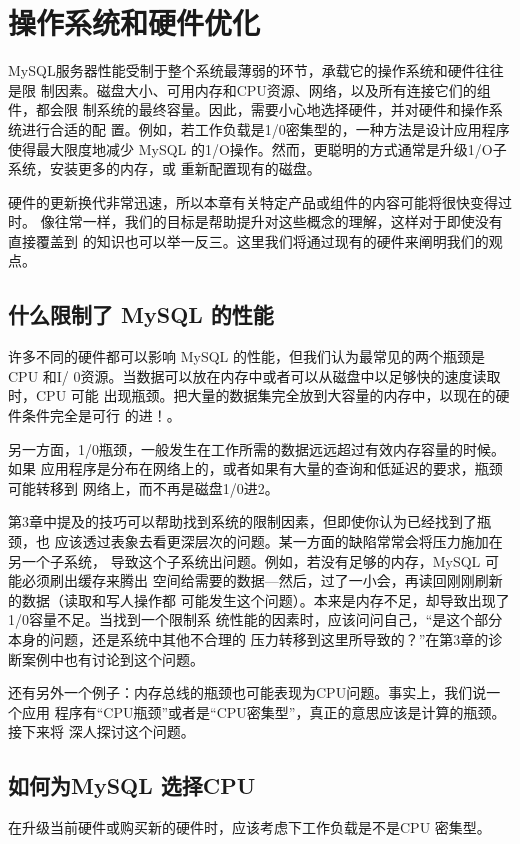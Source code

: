 \chapter{操作系统和硬件优化}
MySQL服务器性能受制于整个系统最薄弱的环节，承载它的操作系统和硬件往往是限
制因素。磁盘大小、可用内存和CPU资源、网络，以及所有连接它们的组件，都会限
制系统的最终容量。因此，需要小心地选择硬件，并对硬件和操作系统进行合适的配
置。例如，若工作负载是1/0密集型的，一种方法是设计应用程序使得最大限度地减少
MySQL 的1/O操作。然而，更聪明的方式通常是升级1/O子系统，安装更多的内存，或
重新配置现有的磁盘。

硬件的更新换代非常迅速，所以本章有关特定产品或组件的内容可能将很快变得过时。
像往常一样，我们的目标是帮助提升对这些概念的理解，这样对于即使没有直接覆盖到
的知识也可以举一反三。这里我们将通过现有的硬件来阐明我们的观点。

\section{什么限制了 MySQL 的性能}
许多不同的硬件都可以影响 MySQL 的性能，但我们认为最常见的两个瓶颈是CPU 和I/
0资源。当数据可以放在内存中或者可以从磁盘中以足够快的速度读取时，CPU 可能
出现瓶颈。把大量的数据集完全放到大容量的内存中，以现在的硬件条件完全是可行
的进！。

另一方面，1/0瓶颈，一般发生在工作所需的数据远远超过有效内存容量的时候。如果
应用程序是分布在网络上的，或者如果有大量的查询和低延迟的要求，瓶颈可能转移到
网络上，而不再是磁盘1/0进2。

第3章中提及的技巧可以帮助找到系统的限制因素，但即使你认为已经找到了瓶颈，也
应该透过表象去看更深层次的问题。某一方面的缺陷常常会将压力施加在另一个子系统，
导致这个子系统出问题。例如，若没有足够的内存，MySQL 可能必须刷出缓存来腾出
空间给需要的数据—然后，过了一小会，再读回刚刚刷新的数据（读取和写人操作都
可能发生这个问题）。本来是内存不足，却导致出现了1/0容量不足。当找到一个限制系
统性能的因素时，应该问问自己，“是这个部分本身的问题，还是系统中其他不合理的
压力转移到这里所导致的？”在第3章的诊断案例中也有讨论到这个问题。

还有另外一个例子：内存总线的瓶颈也可能表现为CPU问题。事实上，我们说一个应用
程序有“CPU瓶颈”或者是“CPU密集型”，真正的意思应该是计算的瓶颈。接下来将
深人探讨这个问题。

\section{如何为MySQL 选择CPU}
在升级当前硬件或购买新的硬件时，应该考虑下工作负载是不是CPU 密集型。

